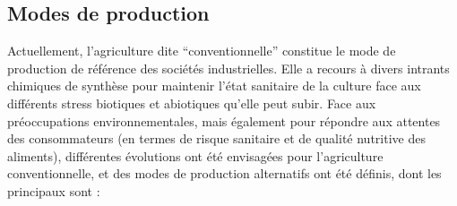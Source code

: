 \documentclass[../thesis.tex]{subfiles}
\begin{document}
    
    
    
    \newpage
    \subsection{Modes de production}
    
    
    Actuellement, l'agriculture dite ``conventionnelle'' constitue le mode de production de référence des sociétés industrielles. Elle a recours à divers intrants chimiques de synthèse \cite{kisinyo2011epuisement} pour maintenir l'état sanitaire de la culture face aux différents stress biotiques \cite{pandey2017impact} et abiotiques \cite{cramer2011effects} qu'elle peut subir. Face aux préoccupations environnementales, mais également pour répondre aux attentes des consommateurs (en termes de risque sanitaire \cite{SurveillanceAlimentaires} et de qualité nutritive des aliments), différentes évolutions ont été envisagées pour l'agriculture conventionnelle, et des modes de production alternatifs ont été définis, dont les principaux sont :
    
\end{document}
